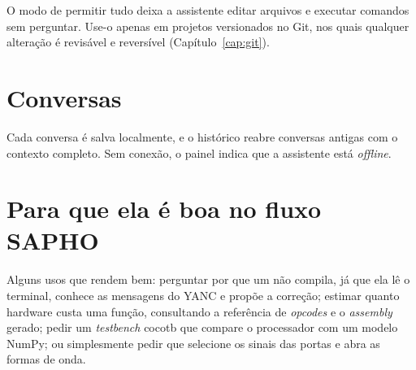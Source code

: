 \begin{perigo}
O modo de permitir tudo deixa a assistente editar arquivos e executar comandos sem perguntar. Use-o apenas em projetos versionados no Git, nos quais qualquer alteração é revisável e reversível (Capítulo~\ref{cap:git}).
\end{perigo}

\section{Conversas}

Cada conversa é salva localmente, e o histórico reabre conversas antigas com o contexto completo. Sem conexão, o painel indica que a assistente está \textit{offline}.

\section{Para que ela é boa no fluxo SAPHO}

Alguns usos que rendem bem: perguntar por que um \cmm{} não compila, já que ela lê o terminal, conhece as mensagens do YANC e propõe a correção; estimar quanto hardware custa uma função, consultando a referência de \textit{opcodes} e o \textit{assembly} gerado; pedir um \textit{testbench} cocotb que compare o processador com um modelo NumPy; ou simplesmente pedir que selecione os sinais das portas e abra as formas de onda.
